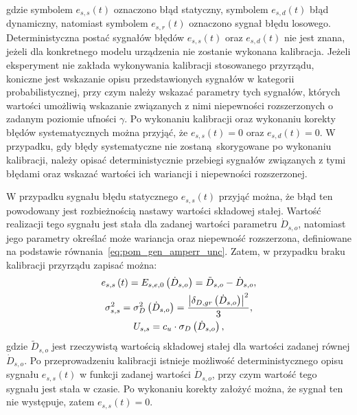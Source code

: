 gdzie symbolem $e_{s,s}(t)$ oznaczono błąd statyczny, symbolem $e_{s,d}(t)$ błąd dynamiczny, natomiast symbolem $e_{s,r}(t)$ oznaczono sygnał błędu losowego. Deterministyczna postać sygnałów błędów $e_{s,s}(t)$ oraz $e_{s,d}(t)$ nie jest znana, jeżeli dla konkretnego modelu urządzenia nie zostanie wykonana kalibracja. Jeżeli eksperyment nie zakłada wykonywania kalibracji stosowanego przyrządu, koniczne jest wskazanie opisu przedstawionych sygnałów w kategorii probabilistycznej, przy czym należy wskazać parametry tych sygnałów, których wartości umożliwią wskazanie związanych z nimi niepewności rozszerzonych o zadanym poziomie ufności $\gamma$. Po wykonaniu kalibracji oraz wykonaniu korekty błędów systematycznych można przyjąć, że $e_{s,s}(t) = 0$ oraz $e_{s,d}(t) = 0$. W przypadku, gdy błędy systematyczne nie zostaną skorygowane po wykonaniu kalibracji, należy opisać deterministycznie przebiegi sygnałów związanych z tymi błędami oraz wskazać wartości ich wariancji i niepewności rozszerzonej.

W przypadku sygnału błędu statycznego $e_{s,s}(t)$ przyjąć można, że błąd ten powodowany jest rozbieżnością nastawy wartości składowej stałej. Wartość realizacji tego sygnału jest stała dla zadanej wartości parametru $\dot{D}_{s,o}$, natomiast jego parametry określać może wariancja oraz niepewność rozszerzona, definiowane na podstawie równania~\eqref{eq:pom_gen_amperr_unc}. Zatem, w przypadku braku kalibracji przyrządu zapisać można:
\begin{gather}
e_{s,s} \left(t\right) = E_{s,e,0} \left(\dot{D}_{s,o}\right) = \tilde{D}_{s,o} - \dot{D}_{s,o} \label{eq:pom_gen_err_stat}, \\
\sigma_{s,s}^{2} = \sigma_{D}^{2} \left(\dot{D}_{s,o}\right) = \frac{\left| \delta_{D,gr} \left(\dot{D}_{s,o}\right) \right|^{2}}{3} \label{eq:pom_gen_var_stat}, \\
U_{s,s} = c_{u} \cdot \sigma_{D} \left(\dot{D}_{s,o}\right) \label{eq:pom_gen_unc_stat},
\end{gather}
gdzie $\tilde{D}_{s,o}$ jest rzeczywistą wartością składowej stałej dla wartości zadanej równej $\dot{D}_{s,o}$. Po przeprowadzeniu kalibracji istnieje możliwość deterministycznego opisu sygnału $e_{s,s}(t)$ w funkcji zadanej wartości $\dot{D}_{s,o}$, przy czym wartość tego sygnału jest stała w czasie. Po wykonaniu korekty założyć można, że sygnał ten nie występuje, zatem $e_{s,s}(t) = 0$.

